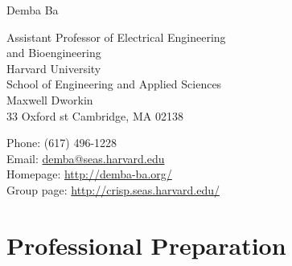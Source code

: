 \documentclass[12pt]{article}
\makeatletter
\let\saved@bibitem\@bibitem %
\def\HCode#1{}
\def\name{Demba Ba}
\renewenvironment{itemize}{
  \begin{list}{}{
    \setlength{\itemsep}{0.25em}
    \setlength{\parskip}{0pt}
    \setlength{\parsep}{0.25em}
  }
}{
  \end{list}
}
\makeatother
\begin{document}
\sloppy

\begingroup
\makeatletter
\let\@bibitem\saved@bibitem %
\endgroup

\HCode{<div class="fluid-container"}

\HCode{<div class="row">}
\HCode{<div class="col-md-12">}
\HCode{<h1>}
{\huge \name}
\HCode{</h1>}
\HCode{</div>} %
\HCode{</div>} %

\bigskip

\HCode{<div class="row">}
\HCode{<div class="col-md-4">}
\begin{minipage}[t]{0.5\textwidth}
  Assistant Professor of Electrical Engineering \\
  and Bioengineering \\
  Harvard University \\
  School of Engineering and Applied Sciences \\
  Maxwell Dworkin \\
  33 Oxford st
  Cambridge, MA 02138 \\
\end{minipage}
\HCode{</div>} %
\HCode{<div class="col-md-8">}
\begin{minipage}[t]{0.5\textwidth}
  Phone: (617) 496-1228 \\
  Email: \href{mailto:demba@seas.harvard.edu}{demba@seas.harvard.edu} \\
  Homepage: \href{http://demba-ba.org/}{http://demba-ba.org/} \\
  Group page: \href{http://crisp.seas.harvard.edu}{http://crisp.seas.harvard.edu/}
\end{minipage}
\HCode{</div>} %
\HCode{</div>} %

\HCode{<div class="row">}
\HCode{<div class="col-md-12">}
\section*{Professional Preparation}

\end{document}
